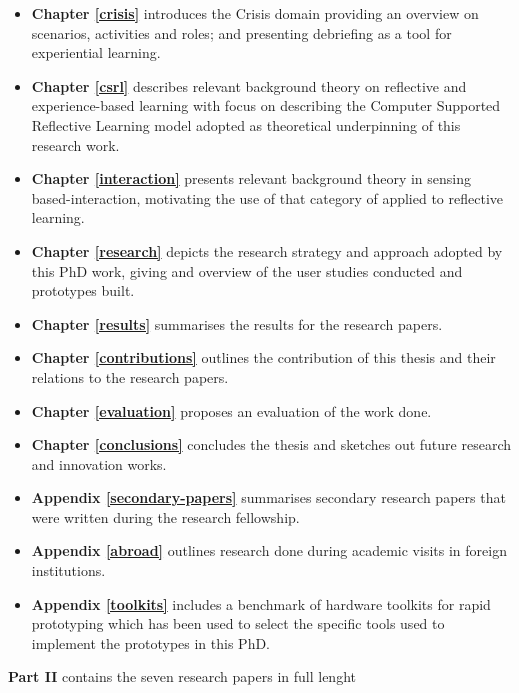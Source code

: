\begin{itemize}
	\item \textbf{Chapter \ref{crisis}} introduces the Crisis domain providing an overview on scenarios, activities and roles; and presenting debriefing as a tool for experiential learning.

	\item \textbf{Chapter \ref{csrl}} describes relevant background theory on reflective and experience-based learning with focus on describing the Computer Supported Reflective Learning model adopted as theoretical underpinning of this research work.

	\item \textbf{Chapter \ref{interaction}} presents relevant background theory in sensing based-interaction, motivating the use of that category of applied to reflective learning.

	\item \textbf{Chapter \ref{research}} depicts the research strategy and approach adopted by this PhD work, giving and overview of the user studies conducted and prototypes built.

	\item \textbf{Chapter \ref{results}} summarises the results for the research papers.

	\item \textbf{Chapter \ref{contributions}} outlines the contribution of this thesis and their relations to the research papers.

	\item \textbf{Chapter \ref{evaluation}} proposes an evaluation of the work done.

	\item \textbf{Chapter \ref{conclusions}} concludes the thesis and sketches out future research and innovation works.

	\item \textbf{Appendix \ref{secondary-papers}} summarises secondary research papers that were written during the research fellowship.

	\item \textbf{Appendix \ref{abroad}} outlines research done during academic visits in foreign institutions.

	\item \textbf{Appendix \ref{toolkits}} includes a benchmark of hardware toolkits for rapid prototyping which has been used to select the specific tools used to implement the prototypes in this PhD. 
\end{itemize}

\textbf{Part II} contains the seven research papers in full lenght
